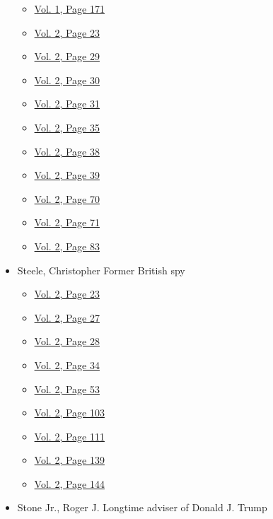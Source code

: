 \begin{itemize}
  \begin{itemize}
  \tightlist
  \item
    \protect\hyperlink{g-page-179}{Vol. 1, Page 171}
  \item
    \protect\hyperlink{g-page-235}{Vol. 2, Page 23}
  \item
    \protect\hyperlink{g-page-241}{Vol. 2, Page 29}
  \item
    \protect\hyperlink{g-page-242}{Vol. 2, Page 30}
  \item
    \protect\hyperlink{g-page-243}{Vol. 2, Page 31}
  \item
    \protect\hyperlink{g-page-247}{Vol. 2, Page 35}
  \item
    \protect\hyperlink{g-page-250}{Vol. 2, Page 38}
  \item
    \protect\hyperlink{g-page-251}{Vol. 2, Page 39}
  \item
    \protect\hyperlink{g-page-282}{Vol. 2, Page 70}
  \item
    \protect\hyperlink{g-page-283}{Vol. 2, Page 71}
  \item
    \protect\hyperlink{g-page-295}{Vol. 2, Page 83}
  \end{itemize}
\item
  Steele, Christopher Former British spy

  \begin{itemize}
  \tightlist
  \item
    \protect\hyperlink{g-page-235}{Vol. 2, Page 23}
  \item
    \protect\hyperlink{g-page-239}{Vol. 2, Page 27}
  \item
    \protect\hyperlink{g-page-240}{Vol. 2, Page 28}
  \item
    \protect\hyperlink{g-page-246}{Vol. 2, Page 34}
  \item
    \protect\hyperlink{g-page-265}{Vol. 2, Page 53}
  \item
    \protect\hyperlink{g-page-315}{Vol. 2, Page 103}
  \item
    \protect\hyperlink{g-page-323}{Vol. 2, Page 111}
  \item
    \protect\hyperlink{g-page-351}{Vol. 2, Page 139}
  \item
    \protect\hyperlink{g-page-356}{Vol. 2, Page 144}
  \end{itemize}
\item
  Stone Jr., Roger J. Longtime adviser of Donald J. Trump


\end{itemize}
